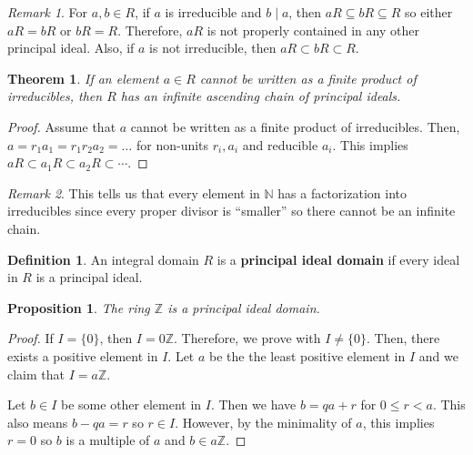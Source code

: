 \documentclass[11pt]{article}
\newtheorem{theorem}{Theorem}[definition]
\newtheorem{proposition}{Proposition}[definition]
\theoremstyle{definition}
\newtheorem{definition}{Definition}[section]
\theoremstyle{remark}
\newtheorem{remark}{Remark}[definition]
\begin{document}
\begin{remark}
    For $a,b\in R$, if $a$ is irreducible and $b\mid a$, then
    $aR\subseteq bR\subseteq R$ so either $aR=bR$ or $bR=R$.
    Therefore, $aR$ is not properly contained in any other principal ideal.
    Also, if $a$ is not irreducible, then $aR\subset bR\subset R$.
\end{remark}

\begin{theorem}
    If an element $a\in R$ cannot be written as a finite product of
    irreducibles, then $R$ has an infinite ascending chain of principal ideals.
\end{theorem}

\begin{proof}
    Assume that $a$ cannot be written as a finite product of irreducibles.
    Then, $a=r_1a_1=r_1r_2a_2=\dots$ for non-units $r_i,a_i$ and reducible $a_i$.
    This implies $aR\subset a_1R\subset a_2R\subset\cdots$.
\end{proof}

\begin{remark}
    This tells us that every element in $\mathbb{N}$ has a factorization into
    irreducibles since every proper divisor is ``smaller'' so there cannot be
    an infinite chain.
\end{remark}

\begin{definition}
    An integral domain $R$ is a \textbf{principal ideal domain} if every ideal
    in $R$ is a principal ideal.
\end{definition}

\begin{proposition}
    \label{thm:integers is principal ideal domain}
    The ring $\mathbb{Z}$ is a principal ideal domain.
\end{proposition}

\begin{proof}
    If $I=\{0\}$, then $I=0\mathbb{Z}$.
    Therefore, we prove with $I\neq\{0\}$.
    Then, there exists a positive element in $I$.
    Let $a$ be the the least positive element in $I$ and we claim that
    $I=a\mathbb{Z}$.

    Let $b\in I$ be some other element in $I$.
    Then we have $b = qa + r$ for $0\leq r<a$.
    This also means $b-qa=r$ so $r\in I$.
    However, by the minimality of $a$, this implies $r=0$ so $b$ is a multiple
    of $a$ and $b\in a\mathbb{Z}$.
\end{proof}
\end{document}
